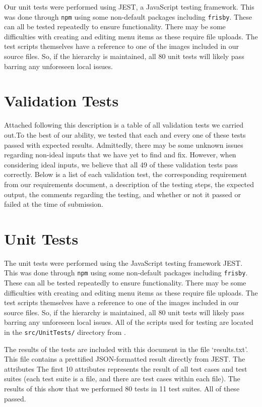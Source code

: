 \documentclass[11pt]{article}
\begin{document}
		Our unit tests were performed using JEST, a JavaScript testing framework. This was done through \texttt{npm} using some non-default packages including \texttt{frisby}. These can all be tested repeatedly to ensure functionality. There may be some difficulties with creating and editing menu items as these require file uploads. The test scripts themselves have a reference to one of the images included in our source files. So, if the hierarchy is maintained, all 80 unit tests will likely pass barring any unforeseen local issues.

	\section{Validation Tests}
		Attached following this description is a table of all validation tests we carried out.To the best of our ability, we tested that each and every one of these tests passed with expected results. Admittedly, there may be some unknown issues regarding non-ideal inputs that we have yet to find and fix. However, when considering ideal inputs, we believe that all 49 of these validation tests pass correctly. Below is a list of each validation test, the corresponding requirement from our requirements document, a description of the testing steps, the expected output, the comments regarding the testing, and whether or not it passed or failed at the time of submission.
	
		

	\section{Unit Tests}
		The unit tests were performed using the JavaScript testing framework JEST. This was done through \texttt{npm} using some non-default packages including \texttt{frisby}. These can all be tested repeatedly to ensure functionality. There may be some difficulties with creating and editing menu items as these require file uploads. The test scripts themselves have a reference to one of the images included in our source files. So, if the hierarchy is maintained, all 80 unit tests will likely pass barring any unforeseen local issues. All of the scripts used for testing are located in the \texttt{src/UnitTests/} directory from \cite{repository}.

		The results of the tests are included with this document in the file `results.txt'. This file contains a prettified JSON-formatted result directly from JEST. The attributes The first 10 attributes represents the result of all test cases and test suites (each test suite is a file, and there are test cases within each file). The results of this show that we performed 80 tests in 11 test suites. All of these passed. 
\end{document}

